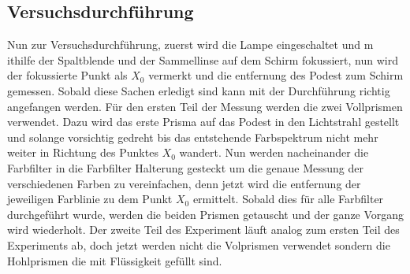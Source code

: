 \subsection{Versuchsdurchführung}
Nun zur Versuchsdurchführung, zuerst wird die Lampe eingeschaltet und m
ithilfe der Spaltblende und der Sammellinse auf dem Schirm fokussiert, 
nun wird der fokussierte Punkt als $X_0$ vermerkt und die entfernung 
des Podest zum Schirm gemessen. Sobald diese Sachen erledigt sind kann 
mit der Durchführung richtig angefangen werden. Für den ersten Teil der 
Messung werden die zwei Vollprismen verwendet. Dazu wird das erste 
Prisma auf das Podest in den Lichtstrahl gestellt und solange vorsichtig 
gedreht bis das entstehende Farbspektrum nicht mehr weiter in Richtung 
des Punktes $X_0$ wandert. Nun werden nacheinander die Farbfilter in 
die Farbfilter Halterung gesteckt um die genaue Messung der verschiedenen 
Farben zu vereinfachen, denn jetzt wird die entfernung der jeweiligen 
Farblinie zu dem Punkt $X_0$ ermittelt. Sobald dies für alle Farbfilter 
durchgeführt wurde, werden die beiden Prismen getauscht und der ganze 
Vorgang wird wiederholt. Der zweite Teil des Experiment läuft analog zum 
ersten Teil des Experiments ab, doch jetzt werden nicht die Volprismen 
verwendet sondern die Hohlprismen die mit Flüssigkeit gefüllt sind. 
